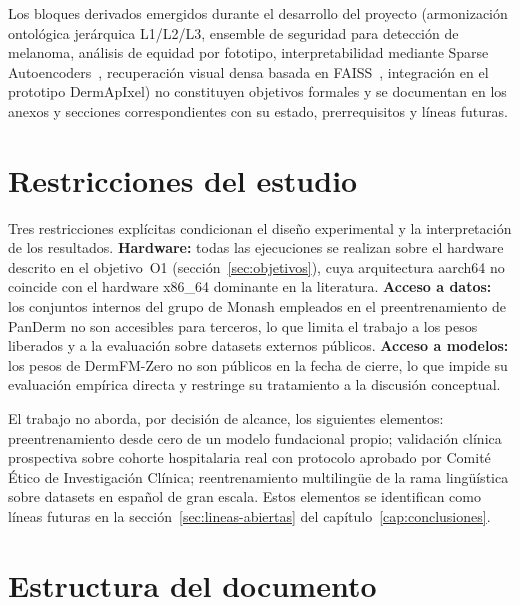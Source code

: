 Los bloques derivados emergidos durante el desarrollo del proyecto
(armonización ontológica jerárquica L1/L2/L3, ensemble de seguridad
para detección de melanoma, análisis de equidad por fototipo,
interpretabilidad mediante Sparse Autoencoders~\cite{templeton2024},
recuperación visual densa basada en FAISS~\cite{faiss2019},
integración en el prototipo DermApIxel) no constituyen objetivos
formales y se documentan en los anexos y secciones correspondientes
con su estado, prerrequisitos y líneas futuras.


\section{Restricciones del estudio}
\label{sec:alcance}

Tres restricciones explícitas condicionan el diseño experimental y
la interpretación de los resultados. \textbf{Hardware:} todas las
ejecuciones se realizan sobre el hardware descrito en el
objetivo~O1 (sección~\ref{sec:objetivos}), cuya arquitectura
aarch64 no coincide con el hardware x86\_64 dominante en la
literatura. \textbf{Acceso a datos:} los
conjuntos internos del grupo de Monash empleados en el
preentrenamiento de PanDerm no son accesibles para terceros, lo que
limita el trabajo a los pesos liberados y a la evaluación sobre
datasets externos públicos. \textbf{Acceso a modelos:} los pesos
de DermFM-Zero no son públicos en la fecha de cierre, lo que impide
su evaluación empírica directa y restringe su tratamiento a la
discusión conceptual.

El trabajo no aborda, por decisión de alcance, los siguientes
elementos: preentrenamiento desde cero de un modelo fundacional
propio; validación clínica prospectiva sobre cohorte hospitalaria
real con protocolo aprobado por Comité Ético de Investigación
Clínica; reentrenamiento multilingüe de la rama lingüística sobre
datasets en español de gran escala. Estos elementos se identifican como líneas
futuras en la sección~\ref{sec:lineas-abiertas} del
capítulo~\ref{cap:conclusiones}.


\section{Estructura del documento}
\label{sec:estructura}

